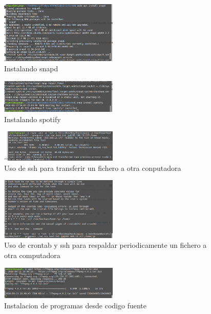 \documentclass[11pt]{article}
\begin{document}
\begin{figure}[H]
\centering
\includegraphics[width=0.5\textwidth]{img/16.png}
\caption{Instalando snapd}
\end{figure}

\begin{figure}[H]
\centering
\includegraphics[width=0.5\textwidth]{img/17.png}
\caption{Instalando spotify}
\end{figure}

\begin{figure}[H]
\centering
\includegraphics[width=0.5\textwidth]{img/18.png}
\caption{Uso de ssh para transferir un fichero a otra conputadora}
\end{figure}

\begin{figure}[H]
\centering
\includegraphics[width=0.5\textwidth]{img/19.png}
\caption{Uso de crontab y ssh para respaldar periodicamente un fichero a otra computadora}
\end{figure}

\begin{figure}[H]
\centering
\includegraphics[width=0.5\textwidth]{img/20.png}
\caption{Instalacion de programas desde codigo fuente}
\end{figure}


\newpage


\end{document}
